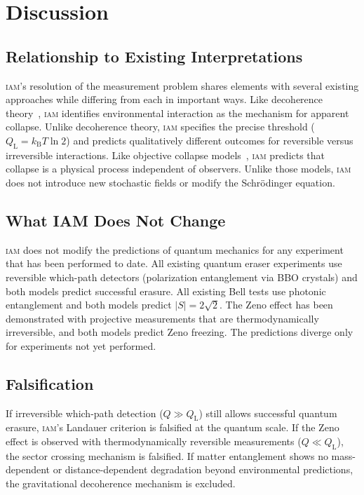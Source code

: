 \documentclass[12pt,letterpaper]{article}
\newcommand{\IAM}{\textsc{iam}}
\newcommand{\kB}{k_{\mathrm{B}}}
\newcommand{\QL}{Q_{\mathrm{L}}}
\begin{document}
\section{Discussion}

\subsection{Relationship to Existing Interpretations}

\IAM's resolution of the measurement problem shares elements with
several existing approaches while differing from each in important ways.
Like decoherence theory~\citep{Zurek2003}, \IAM{} identifies
environmental interaction as the mechanism for apparent collapse. Unlike
decoherence theory, \IAM{} specifies the precise threshold
($\QL = \kB T \ln 2$) and predicts qualitatively different outcomes for
reversible versus irreversible interactions. Like objective collapse
models~\citep{Penrose1996,Diosi1987}, \IAM{} predicts that collapse is
a physical process independent of observers. Unlike those models, \IAM{}
does not introduce new stochastic fields or modify the
Schr\"{o}dinger equation.

\subsection{What IAM Does Not Change}

\IAM{} does not modify the predictions of quantum mechanics for any
experiment that has been performed to date. All existing quantum eraser
experiments use reversible which-path detectors (polarization
entanglement via BBO crystals) and both models predict successful
erasure. All existing Bell tests use photonic entanglement and both
models predict $|S| = 2\sqrt{2}$. The Zeno effect has been demonstrated
with projective measurements that are thermodynamically irreversible,
and both models predict Zeno freezing. The predictions diverge only for
experiments not yet performed.

\subsection{Falsification}

If irreversible which-path detection ($Q \gg \QL$) still allows
successful quantum erasure, \IAM's Landauer criterion is falsified at
the quantum scale. If the Zeno effect is observed with
thermodynamically reversible measurements ($Q \ll \QL$), the sector
crossing mechanism is falsified. If matter entanglement shows no
mass-dependent or distance-dependent degradation beyond environmental
predictions, the gravitational decoherence mechanism is excluded.
\end{document}
